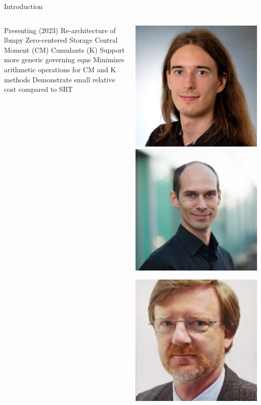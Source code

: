 \placelogofalse
\begin{frame}{Introduction}
\begin{columns}
\begin{outline}
  \1 Presenting \cite{Hennig2023} (2023)
  \1 Re-architecture of {lbmpy}
  \2 Zero-centered Storage
  \2 Central Moment (CM)
  \2 Cumulants (K)
  \2 Support more generic governing eqns
  \1 Minimizes arithmetic operations for CM and K methods
  \1 Demonstrate small relative cost compared to SRT
\end{outline}
\begin{center}

  \includegraphics[width=0.28\linewidth]{frederik_hennig.jpg}
  \includegraphics[width=0.28\linewidth]{markus_holzer.jpg}

  \includegraphics[width=0.28\linewidth]{ulrich_rude.jpg}
\end{center} 
\end{columns}
\end{frame}
\placelogotrue


